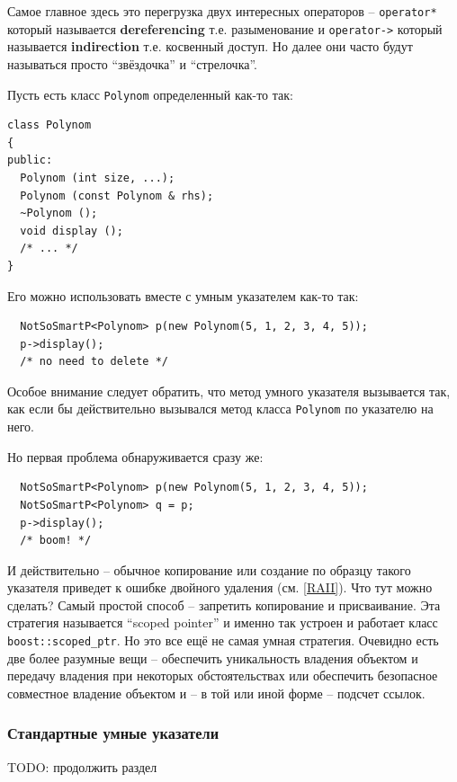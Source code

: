 \documentclass[a4paper,12pt,oneside]{article}
\begin{document}
Самое главное здесь это перегрузка двух интересных операторов -- \lstinline!operator*! который называется \textbf{dereferencing} т.е. разыменование и \lstinline!operator->! который называется \textbf{indirection} т.е. косвенный доступ. Но далее они часто будут называться просто ``звёздочка'' и ``стрелочка''.

Пусть есть класс \lstinline!Polynom! определенный как-то так:

\begin{lstlisting}
class Polynom
{
public:
  Polynom (int size, ...);
  Polynom (const Polynom & rhs);
  ~Polynom ();
  void display ();
  /* ... */
}
\end{lstlisting}

Его можно использовать вместе с умным указателем как-то так:

\begin{lstlisting}
  NotSoSmartP<Polynom> p(new Polynom(5, 1, 2, 3, 4, 5));
  p->display();
  /* no need to delete */
\end{lstlisting}

Особое внимание следует обратить, что метод умного указателя вызывается так, как если бы действительно вызывался метод класса \lstinline!Polynom! по указателю на него.

Но первая проблема обнаруживается сразу же:

\begin{lstlisting}
  NotSoSmartP<Polynom> p(new Polynom(5, 1, 2, 3, 4, 5));
  NotSoSmartP<Polynom> q = p;
  p->display();
  /* boom! */
\end{lstlisting}

И действительно -- обычное копирование или создание по образцу такого указателя приведет к ошибке двойного удаления (см. \ref{RAII}). Что тут можно сделать? Самый простой способ -- запретить копирование и присваивание. Эта стратегия называется ``scoped pointer'' и именно так устроен и работает класс \lstinline!boost::scoped_ptr!. Но это все ещё не самая умная стратегия. Очевидно есть две более разумные вещи -- обеспечить уникальность владения объектом и передачу владения при некоторых обстоятельствах или обеспечить безопасное совместное владение объектом и -- в той или иной форме -- подсчет ссылок.

\subsubsection{Стандартные умные указатели}

TODO: продолжить раздел
\end{document}

